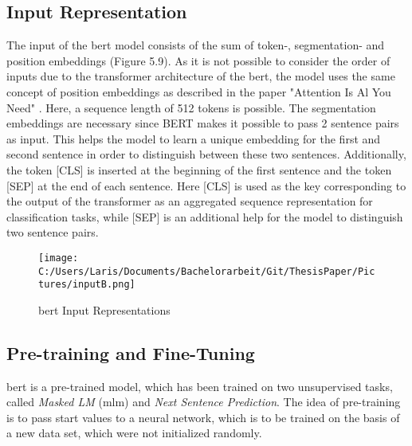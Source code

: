 \documentclass[a4paper, 11pt,titlepage,oneside,openany]{book}
\begin{document}
\subsection{Input Representation}
The input of the \gls{bert} model consists of the sum of token-, segmentation- and position embeddings (Figure 5.9). As it is not possible to consider the order of inputs due to the transformer architecture of the \gls{bert}, the model uses the same concept of position embeddings as described in the paper "Attention Is Al You Need" \cite{attention}. Here, a sequence length of 512 tokens is possible. The segmentation embeddings are necessary since BERT makes it possible to pass 2 sentence pairs as input. This helps the model to learn a unique embedding for the first and second sentence in order to distinguish between these two sentences.  Additionally, the token [CLS] is inserted at the beginning of the first sentence and the token [SEP] at the end of each sentence. Here [CLS] is used as the key corresponding to the output of the transformer as an aggregated sequence representation for classification tasks, while [SEP] is an additional help for the model to distinguish two sentence pairs.
\begin{figure}[t]
	\centering
	\texttt{[image: C:/Users/Laris/Documents/Bachelorarbeit/Git/ThesisPaper/Pictures/inputB.png]}
	\caption{\gls{bert} Input Representations \cite{bert}}
	
\end{figure}

\subsection{Pre-training and Fine-Tuning}
\gls{bert} is a pre-trained model, which has been trained on two unsupervised tasks, called \textit{Masked LM} (\gls{mlm}) and \textit{Next Sentence Prediction}. The idea of pre-training is to pass start values to a neural network, which is to be trained on the basis of a new data set, which were not initialized randomly. \\
\end{document}
